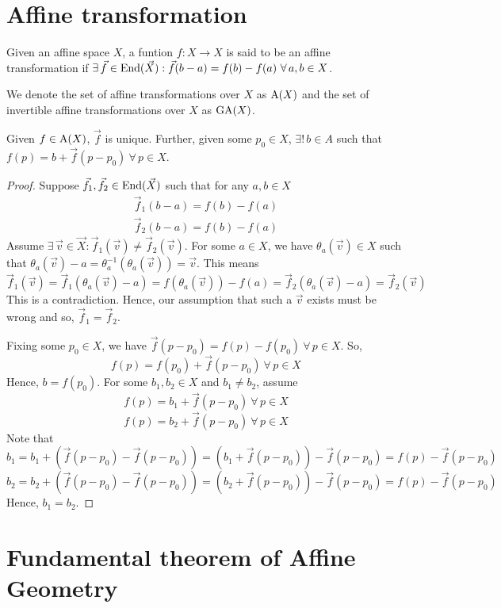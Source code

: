 \section{Affine transformation}

\begin{definition}
    Given an affine space $X$, a funtion $f: X \to X$ is said to be an affine
    transformation if $\exists\,\vec{f}\in\operatorname{End}(\vec{X}): \vec{f}(b-a)=f(b)-f(a)\ \forall\,a,b \in X$.
\end{definition}

\begin{notation}
    We denote the set of affine transformations over $X$ as $\operatorname{A}(X)$ and the set of
    invertible affine transformations over $X$ as $\operatorname{GA}(X)$.
\end{notation}

\begin{theorem}
    Given $f\in\operatorname{A}(X)$, $\vec{f}$ is unique. Further, given some $p_0 \in X$,
    $\exists!\,b\in{A}$ such that $f(p)=b+\vec{f}(p-p_0)\ \forall\,p \in X$.
\end{theorem}

\begin{proof}
    Suppose $\vec{f}_1,\vec{f}_2\in\operatorname{End}(\vec{X})$ such that for any $a,b \in X$
    \begin{align*}
        \vec{f}_1(b-a)=f(b)-f(a) \\
        \vec{f}_2(b-a)=f(b)-f(a)
    \end{align*}
    Assume $\exists\,\vec{v}\in\vec{X}: \vec{f}_1(\vec{v})\neq\vec{f}_2(\vec{v})$.
    For some $a \in X$, we have $\theta_a(\vec{v}) \in X$ such that
    $\theta_a(\vec{v})-a=\theta_a^{-1}(\theta_a(\vec{v}))=\vec{v}$. This means
    \[
        \vec{f}_1(\vec{v}) = \vec{f}_1(\theta_a(\vec{v})-a)
        = f(\theta_a(\vec{v}))-f(a)
        = \vec{f}_2(\theta_a(\vec{v})-a)= \vec{f}_2(\vec{v})
    \]
    This is a contradiction. Hence, our assumption that such a $\vec{v}$ exists
    must be wrong and so, $\vec{f}_1=\vec{f}_2$.
    \vspace{1ex}

    \noindent
    Fixing some $p_0 \in X$, we have
    $\vec{f}(p-p_0)=f(p)-f(p_0)\ \forall\,p \in X$. So,
    \[ f(p)=f(p_0)+\vec{f}(p-p_0)\ \forall\,p \in X \]
    Hence, $b=f(p_0)$. For some $b_1,b_2 \in X$ and $b_1 \neq b_2$, assume
    \[ f(p)=b_1+\vec{f}(p-p_0)\ \forall\,p \in X \]
    \[ f(p)=b_2+\vec{f}(p-p_0)\ \forall\,p \in X \]
    Note that
    \[ b_1=b_1+(\vec{f}(p-p_0)-\vec{f}(p-p_0))=(b_1+\vec{f}(p-p_0))-\vec{f}(p-p_0)=f(p)-\vec{f}(p-p_0) \]
    \[ b_2=b_2+(\vec{f}(p-p_0)-\vec{f}(p-p_0))=(b_2+\vec{f}(p-p_0))-\vec{f}(p-p_0)=f(p)-\vec{f}(p-p_0) \]
    Hence, $b_1=b_2$.
\end{proof}

\section{Fundamental theorem of Affine Geometry}
